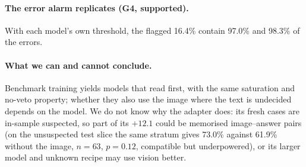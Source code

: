 \paragraph{The error alarm replicates (G4, supported).}
With each model's own threshold, the flagged 16.4\% contain 97.0\% and 98.3\% of the errors.

\paragraph{What we can and cannot conclude.}
Benchmark training yields models that read first, with the same saturation and no-veto property; whether they also use the image where the text is undecided depends on the model.
We do not know why the adapter does: its fresh cases are in-sample suspected, so part of its $+12.1$ could be memorised image--answer pairs (on the unsuspected test slice the same stratum gives 73.0\% against 61.9\% without the image, $n{=}63$, $p=0.12$, compatible but underpowered), or its larger model and unknown recipe may use vision better.
